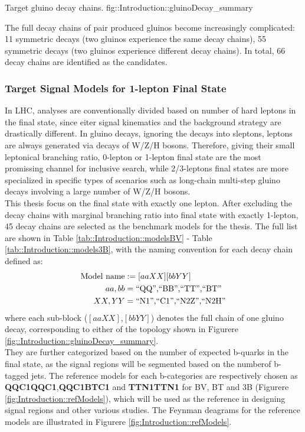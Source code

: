 {Target gluino decay chains.}
{fig::Introduction::gluinoDecay_summary}


The full decay chains of pair produced gluinos become increasingly complicated: 11 symmetric decays (two gluinos experience the same decay chains), 55 symmetric decays (two gluinos experience different decay chains).
In total, 66 decay chains are identified as the candidates. \\


\subsubsection{Target Signal Models for 1-lepton Final State}
In LHC, analyses are conventionally divided based on number of hard leptons in the final state, since eiter signal kinematics and the background strategy are drastically different. In gluino decays, ignoring the decays into sleptons, leptons are always generated via decays of W/Z/H bosons. Therefore, giving their small leptonical branching ratio, 0-lepton or 1-lepton final state are the most promissing channel for inclusive search, while 2/3-leptons final states are more specialized in specific types of scenarios such as long-chain multi-step gluino decays involving a large number of W/Z/H bosons. \\

This thesis focus on the final state with exactly one lepton. 
After excluding the decay chains with marginal branching ratio into final state with exactly 1-lepton,
45 decay chains are selected as the benchmark models for the thesis.
The full list are shown in Table \ref{tab::Introduction::modelsBV} - Table \ref{tab::Introduction::models3B}, with the naming convention for each decay chain defined as:
\begin{align}
  \mbox{Model name} & := [aaXX][bbYY]  \nonumber \\
  aa,bb & = \mbox{``QQ'',``BB'',``TT'',``BT''}  \nonumber \\
  XX,YY & = \mbox{``N1'',``C1'',``N2Z'',``N2H''}
\end{align}
where each sub-block ($[aaXX]$,$[bbYY]$) denotes the full chain of one gluino decay, corresponding to either of the topology shown in Figurere \ref{fig::Introduction::gluinoDecay_summary}. \\

They are further categorized based on the number of expected b-quarks in the final state, as the signal regions will be segmented based on the numberof b-tagged jets. The reference models for each b-categories are respectively chosen as \textbf{QQC1QQC1},\textbf{QQC1BTC1} and \textbf{TTN1TTN1} for BV, BT and 3B (Figurere \ref{fig:Introduction::refModels}), which will be used as the reference in designing signal regions and other various studies. The Feynman deagrams for the reference models are illustrated in Figurere \ref{fig:Introduction::refModels}.\\

